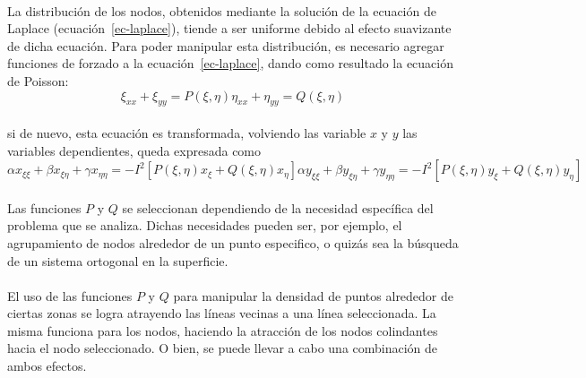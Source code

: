 \documentclass[letterpaper, openright, 12pt]{book}
\begin{document}
    \paragraph*{}
    La distribución de los nodos, obtenidos mediante la solución de la
    ecuación de Laplace (ecuación~\ref{ec-laplace}), tiende a ser uniforme
    debido al efecto suavizante de dicha ecuación. Para poder manipular esta
    distribución, es necesario agregar funciones de forzado a la
    ecuación~\ref{ec-laplace}, dando como resultado la ecuación de Poisson:
    \begin{subequations}
        \begin{equation}
            \xi_{xx} + \xi_{yy} = P(\xi, \eta)
        \end{equation}
        \begin{equation}
            \eta_{xx} + \eta_{yy} = Q(\xi, \eta)
        \end{equation}
        \label{ec-poisson}
    \end{subequations}\\
    si de nuevo, esta ecuación es transformada, volviendo las variable $x$ y
    $y$ las variables dependientes, queda expresada como
    \begin{subequations}
        \begin{equation}
            \alpha x_{\xi \xi} + \beta x_{\xi \eta}
                + \gamma x_{\eta \eta} = -I^2 [P(\xi, \eta) x_{\xi}
                + Q(\xi, \eta) x_{\eta}]
        \end{equation}
        \begin{equation}
            \alpha y_{\xi \xi} + \beta y_{\xi \eta} + \gamma y_{\eta \eta} = -I^2 [P(\xi, \eta) y_{\xi} + Q(\xi, \eta) y_{\eta}]
        \end{equation}
        \label{ec-poisson-invertida}
    \end{subequations}

    \paragraph*{}
    Las funciones $P$ y $Q$ se seleccionan dependiendo de la necesidad
    específica del problema que se analiza. Dichas necesidades pueden ser,
    por ejemplo, el agrupamiento de nodos alrededor de un punto especifico,
    o quizás sea la búsqueda de un sistema ortogonal en la superficie.

    \paragraph*{}
    El uso de las funciones $P$ y $Q$ para manipular la densidad de puntos
    alrededor de ciertas zonas se logra atrayendo las líneas vecinas a una
    línea seleccionada. La misma funciona para los nodos, haciendo la
    atracción de los nodos colindantes hacia el nodo seleccionado. O bien,
    se puede llevar a cabo una combinación de ambos efectos.
\end{document}
